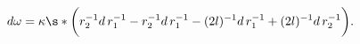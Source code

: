 \begin{equation} \label{omeq2}
 d \omega = \kappa \s* \biggl( r_2^{-1} d\, r_1^{-1}
 - r_2^{-1} d\, r_1^{-1} - (2 l)^{-1} d\, r_1^{-1}
 + (2 l)^{-1} d\, r_2^{-1} \biggr).
\end{equation}

